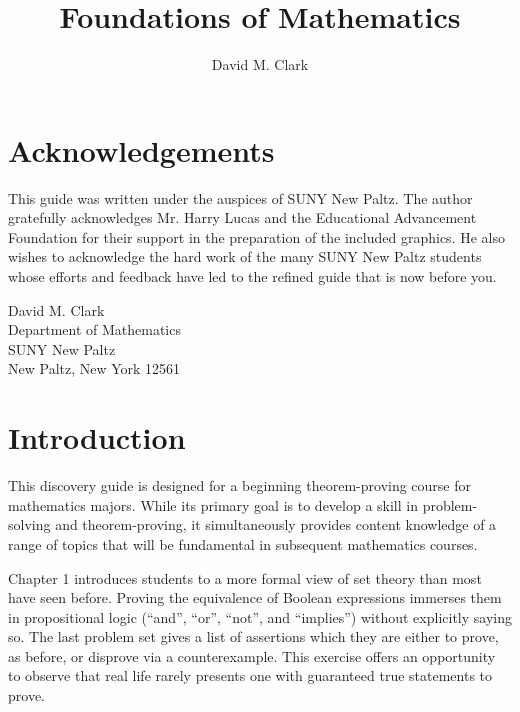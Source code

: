 \documentclass{article}
\newcommand{\0}{\mathbf 0}
\newcommand{\1}{\mathbf 1}
\let\titlepageAuthor\author
\renewcommand{\author}[1]{\newcommand{\headerAuthor}{#1}\titlepageAuthor{#1}}
\let\titlepageTitle\title
\renewcommand{\title}[1]{\newcommand{\headerTitle}{#1}\titlepageTitle{#1}}
\begin{document}
\title{Foundations of Mathematics}
\author{David M. Clark}
\date{ }
\maketitle
\thispagestyle{empty}



\newpage

\setcounter{tocdepth}{3} 
\tableofcontents
\thispagestyle{empty}


\newpage

\section*{Acknowledgements}


This guide was written under the auspices of SUNY New Paltz. The author gratefully acknowledges Mr. Harry Lucas and the Educational Advancement Foundation for their support in the preparation of the included graphics. He also wishes to acknowledge the hard work of the many SUNY New Paltz students whose efforts and feedback have led to the refined guide that is now before you.

\begin{flushright}
David M. Clark \\
Department of Mathematics \\
SUNY New Paltz \\
New Paltz, New York 12561
\end{flushright}



\newpage

\section*{Introduction}

This discovery guide is designed for a beginning theorem-proving course for mathematics majors. While its primary goal is to develop a skill in problem-solving and theorem-proving, it simultaneously provides content knowledge of a range of topics that will be fundamental in subsequent mathematics courses.

Chapter 1 introduces students to a more formal view of set theory than most have seen before. Proving the equivalence of Boolean expressions immerses them in propositional logic (``and'', ``or'', ``not'', and ``implies'') without explicitly saying so. The last problem set gives a list of assertions which they are either to prove, as before, or disprove via a counterexample. This exercise offers an opportunity to observe that real life rarely presents one with guaranteed true statements to prove.
\end{document}
